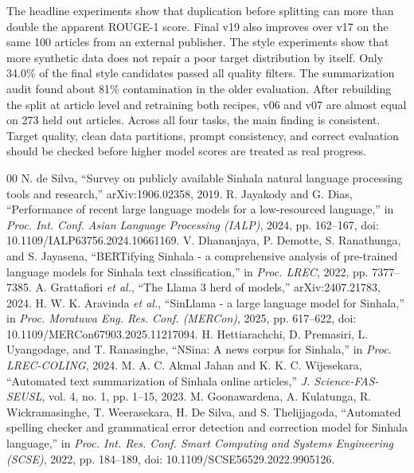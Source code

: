 \documentclass[a4paper,conference]{IEEEtran}
\begin{document}
The headline experiments show that duplication before splitting can more than
double the apparent ROUGE-1 score. Final v19 also improves over v17 on the same
100 articles from an external publisher. The style experiments show that more
synthetic data does not repair a poor target distribution by itself. Only
34.0\% of the final style candidates passed all quality filters. The
summarization audit found about 81\% contamination in the older evaluation.
After rebuilding the split at article level and retraining both recipes, v06
and v07 are almost equal on 273 held out articles. Across all four tasks, the
main finding is consistent. Target quality, clean data partitions, prompt
consistency, and correct evaluation should be checked before higher model
scores are treated as real progress.

\begin{thebibliography}{00}
 N. de Silva, ``Survey on publicly available Sinhala natural language processing tools and research,'' arXiv:1906.02358, 2019.
 R. Jayakody and G. Dias, ``Performance of recent large language models for a low-resourced language,'' in \textit{Proc. Int. Conf. Asian Language Processing (IALP)}, 2024, pp. 162--167, doi: 10.1109/IALP63756.2024.10661169.
 V. Dhananjaya, P. Demotte, S. Ranathunga, and S. Jayasena, ``BERTifying Sinhala - a comprehensive analysis of pre-trained language models for Sinhala text classification,'' in \textit{Proc. LREC}, 2022, pp. 7377--7385.
 A. Grattafiori \textit{et al.}, ``The Llama 3 herd of models,'' arXiv:2407.21783, 2024.
 H. W. K. Aravinda \textit{et al.}, ``SinLlama - a large language model for Sinhala,'' in \textit{Proc. Moratuwa Eng. Res. Conf. (MERCon)}, 2025, pp. 617--622, doi: 10.1109/MERCon67903.2025.11217094.
 H. Hettiarachchi, D. Premasiri, L. Uyangodage, and T. Ranasinghe, ``NSina: A news corpus for Sinhala,'' in \textit{Proc. LREC-COLING}, 2024.
 M. A. C. Akmal Jahan and K. K. C. Wijesekara, ``Automated text summarization of Sinhala online articles,'' \textit{J. Science-FAS-SEUSL}, vol. 4, no. 1, pp. 1--15, 2023.
 M. Goonawardena, A. Kulatunga, R. Wickramasinghe, T. Weerasekara, H. De Silva, and S. Thelijjagoda, ``Automated spelling checker and grammatical error detection and correction model for Sinhala language,'' in \textit{Proc. Int. Res. Conf. Smart Computing and Systems Engineering (SCSE)}, 2022, pp. 184--189, doi: 10.1109/SCSE56529.2022.9905126.

\end{thebibliography}
\end{document}
